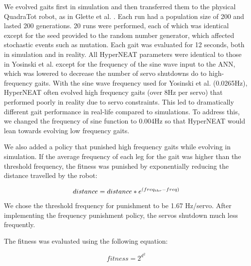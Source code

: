 We evolved gaits first in simulation and then transferred them to the physical QuadraTot robot, as in Glette et al. \cite{glette}. 
Each run had a population size of 200 and lasted 200 generations. 20 runs were performed, each of which was identical except for the seed provided to the random number generator, which affected stochastic events such as mutation. 
Each gait was evaluated for 12 seconds, both in simulation and in reality. 
All HyperNEAT parameters were identical to those in Yosinski et al. \cite{yos:clune} except for the frequency of the sine wave input to the ANN, which was lowered to decrease the number of servo shutdowns do to high-frequency gaits. 
With the sine wave frequency used for Yosinski et al. \cite{yos:clune} (0.0265Hz), HyperNEAT often evolved high frequency gaits (over 8Hz per servo) that performed poorly in reality due to servo constraints. 
This led to dramatically different gait performance in real-life compared to simulations. 
To address this, we changed the frequency of sine function to 0.004Hz so that HyperNEAT would lean towards evolving low frequency gaits.


%
%

We also added a policy that punished high frequency gaits while evolving in simulation. 
If the average frequency of each leg for the gait was higher than the threshold frequency, the fitness was punished by exponentially reducing the distance travelled by the robot:

\begin{equation}
distance = distance*e^{(freq_{thr}-freq)} \\
\end{equation}

We chose the threshold frequency for punishment to be 1.67 Hz/servo. After implementing the frequency punishment policy, the servos shutdown much less frequently. 


The fitness was evaluated using the following equation:

\begin{equation}
fitness = 2^{d^{2}}
\end{equation}


